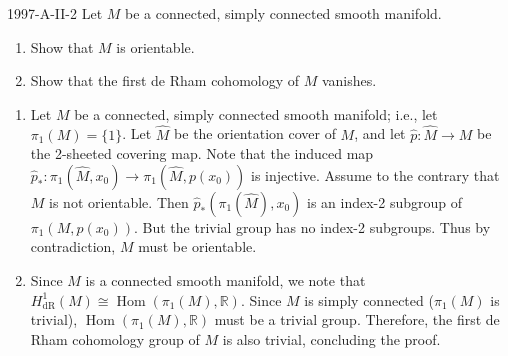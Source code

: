 \documentclass{article}
\begin{document}
	\begin{prb}{1997-A-II-2}
		Let $M$ be a connected, simply connected smooth manifold. \vspace{-0.25cm}
		\begin{enumerate}[itemsep =-2pt,label = (\alph{*})]
			\item Show that $M$ is orientable. 
			\item Show that the first de Rham cohomology of $M$ vanishes. 
		\end{enumerate}
	\end{prb}
	\begin{enumerate}[itemsep =-2pt,label = (\alph{*})]
		\item Let $M$ be a connected, simply connected smooth manifold; i.e., let $\pi_{1}(M)= \{1\}$. Let $\hat{M}$ be the orientation cover of $M$, and let $\hat{p}: \hat{M} \to M$ be the 2-sheeted covering map. Note that the induced map $\hat{p}_\ast: \pi_1(\hat{M}, x_0) \to \pi_1(\hat{M}, p(x_0))$ is injective. Assume to the contrary that $M$ is not orientable. Then $\hat{p}_\ast(\pi_1(\hat{M}),x_0)$ is an index-2 subgroup of $\pi_1(M, p(x_0))$. But the trivial group has no index-2 subgroups. Thus by contradiction, $M$ must be orientable. 
		\item Since $M$ is a connected smooth manifold, we note that $H^{1}_{\text{dR}}(M) \cong \operatorname{Hom}(\pi_1(M), \mathbb{R})$. Since $M$ is simply connected ($\pi_1(M)$ is trivial), $\operatorname{Hom}(\pi_1(M), \mathbb{R})$ must be a trivial group. Therefore, the first de Rham cohomology group of $M$ is also trivial, concluding the proof. 
	\end{enumerate}
	
\end{document}
